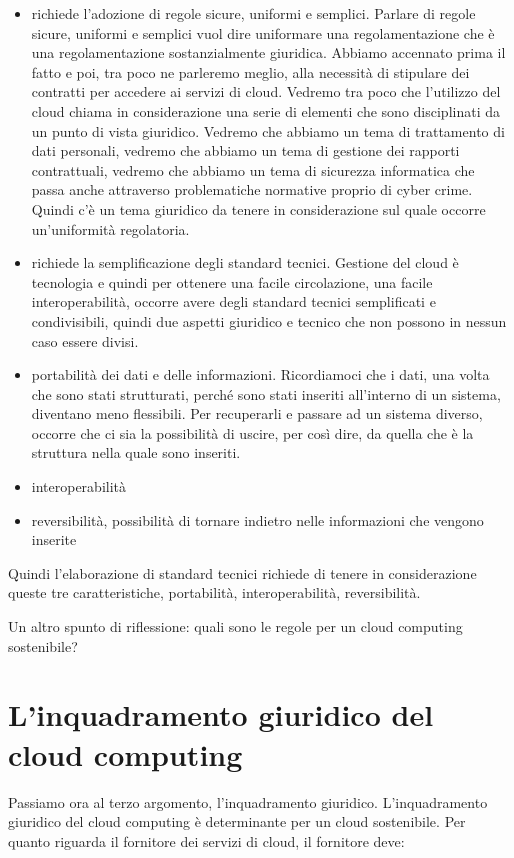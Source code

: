 \begin{itemize}
    \item richiede l'adozione di regole sicure, uniformi e semplici. Parlare di regole sicure, uniformi e semplici vuol dire uniformare una regolamentazione che è una regolamentazione sostanzialmente giuridica. Abbiamo accennato prima il fatto e poi, tra poco ne parleremo meglio, alla necessità di stipulare dei contratti per accedere ai servizi di cloud. Vedremo tra poco che l'utilizzo del cloud chiama in considerazione una serie di elementi che sono disciplinati da un punto di vista giuridico. Vedremo che abbiamo un tema di trattamento di dati personali, vedremo che abbiamo un tema di gestione dei rapporti contrattuali, vedremo che abbiamo un tema di sicurezza informatica che passa anche attraverso problematiche normative proprio di cyber crime. Quindi c'è un tema giuridico da tenere in considerazione sul quale occorre un'uniformità regolatoria. 
    \item richiede la semplificazione degli standard tecnici. Gestione del cloud è tecnologia e quindi per ottenere una facile circolazione, una facile interoperabilità, occorre avere degli standard tecnici semplificati e condivisibili, quindi due aspetti giuridico e tecnico che non possono in nessun caso essere divisi. 
    \item portabilità dei dati e delle informazioni. Ricordiamoci che i dati, una volta che sono stati strutturati, perché sono stati inseriti all'interno di un sistema, diventano meno flessibili. Per recuperarli e passare ad un sistema diverso, occorre che ci sia la possibilità di uscire, per così dire, da quella che è la struttura nella quale sono inseriti.
    \item interoperabilità
    \item reversibilità, possibilità di tornare indietro nelle informazioni che vengono inserite
\end{itemize}

Quindi l'elaborazione di standard tecnici richiede di tenere in considerazione queste tre caratteristiche, portabilità, interoperabilità, reversibilità. 

Un altro spunto di riflessione: quali sono le regole per un cloud computing sostenibile? 

\section{L'inquadramento giuridico del cloud computing}
Passiamo ora al terzo argomento, l'inquadramento giuridico. L'inquadramento giuridico del cloud computing è determinante per un cloud sostenibile. Per quanto riguarda il fornitore dei servizi di cloud, il fornitore deve:

